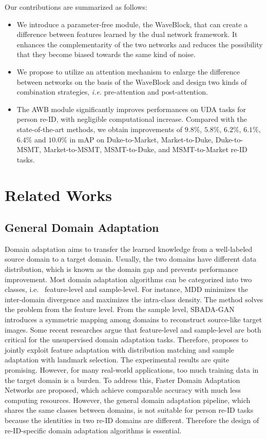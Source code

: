 \documentclass[journal]{IEEEtran}
\begin{document}
Our contributions are summarized as follows:
\begin{itemize}
  \item We introduce a parameter-free module, the WaveBlock, that can create a difference between features learned by the dual network framework. It enhances the complementarity of the two networks and reduces the possibility that they become biased towards the same kind of noise.
  \item We propose to utilize an attention mechanism to enlarge the difference between networks on the basis of the WaveBlock and design two kinds of combination strategies, \textit{i.e.} pre-attention and post-attention. 
  \item The AWB module significantly improves performances on UDA tasks for person re-ID, with negligible computational increase. Compared with the state-of-the-art methods, we obtain improvements of $9.8\%$, $5.8\%$, $6.2\%$, $6.1\%$, $6.4\%$ and $10.0\%$ in mAP on Duke-to-Market, Market-to-Duke, Duke-to-MSMT, Market-to-MSMT, MSMT-to-Duke, and MSMT-to-Market re-ID tasks. 
\end{itemize}

\section{Related Works}
\subsection{General Domain Adaptation}
Domain adaptation aims to transfer the learned knowledge from a well-labeled source domain to a target domain.  Usually, the two domains have different data distribution, which is known as the domain gap and prevents performance improvement. Most domain adaptation algorithms \cite{long2016unsupervised, saito2018maximum, ganin2015unsupervised, Kang_2019_CVPR, sener2016learning, Pinheiro_2018_CVPR} can be categorized into two classes, i.e. \ feature-level and sample-level.  For instance,  MDD \cite{li2020maximum} minimizes the inter-domain divergence and maximizes the intra-class density. The method solves the problem from the feature level. From the sample level, SBADA-GAN \cite{russo2018source} introduces a symmetric mapping among domains to reconstruct source-like target images. Some recent researches argue that feature-level and sample-level are both critical for the unsupervised domain adaptation tasks.  Therefore,  \cite{li2019locality} proposes to jointly exploit feature adaptation with distribution matching and sample adaptation with landmark selection. The experimental results are quite promising. However, for many real-world applications, too much training data in the target domain is a burden. To address this, Faster Domain Adaptation Networks \cite{li2021faster} are proposed, which achieve comparable accuracy with much less computing resources.  However, the general domain adaptation pipeline, which shares the same classes between domains, is not suitable for person re-ID tasks because the identities in two re-ID domains are different. Therefore the design of re-ID-specific domain adaptation algorithms is essential.
\end{document}

